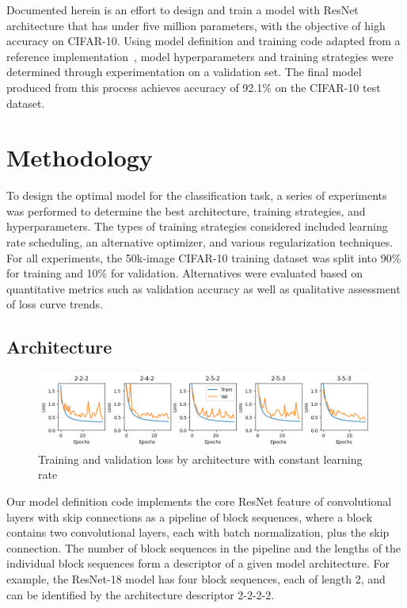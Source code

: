 \documentclass[letterpaper]{article} %
\begin{document}
Documented herein is an effort to design and train a model with ResNet architecture that has under five
million parameters, with the objective of high accuracy on CIFAR-10.
Using model definition and training code adapted from a reference implementation~\cite{kl:2021}, model
hyperparameters and training strategies were determined through experimentation on a validation set.
The final model produced from this process achieves accuracy of 92.1\% on the CIFAR-10 test dataset.

\section{Methodology}

To design the optimal model for the classification task, a series of experiments was performed to
determine the best architecture, training strategies, and hyperparameters.
The types of training strategies considered included learning rate scheduling, an alternative optimizer,
and various regularization techniques.
For all experiments, the 50k-image CIFAR-10 training dataset was split into 90\% for training and 10\% for validation.
Alternatives were evaluated based on quantitative metrics such as validation accuracy as well as qualitative assessment
of loss curve trends.

\subsection{Architecture}

\begin{figure}[t]
\centering
\includegraphics[width=0.99\textwidth]{loss-curves-5}
\caption{Training and validation loss by architecture with constant learning rate}
\label{fig2}
\end{figure}

Our model definition code implements the core ResNet feature of convolutional layers with skip connections as a
pipeline of block sequences, where a block contains two convolutional layers, each with batch normalization, plus the
skip connection.
The number of block sequences in the pipeline and the lengths of the individual block sequences form a descriptor of a
given model architecture.
For example, the ResNet-18 model has four block sequences, each of length 2, and can be identified by the architecture
descriptor 2-2-2-2.
\end{document}
